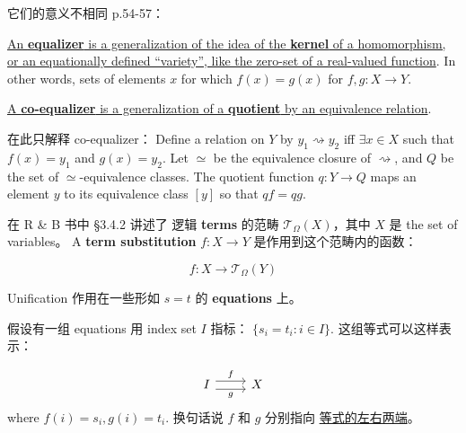 \documentclass[12pt, orivec]{article}
\newcommand{\cc}[2]{#1}
\newcommand{\cc}[2]{#2}
\begin{document}
\cc{它们的意义不相同 \parencite{Awodey2006} p.54-57：
}{
Their meanings are different \parencite{Awodey2006} p.54-57:
}

\uline{An \textbf{equalizer} is a generalization of the idea of the \textbf{kernel} of a homomorphism, or an equationally defined ``variety'', like the zero-set of a real-valued function}.  In other words, sets of elements $x$ for which $f(x) = g(x)$ for $f,g: X \rightarrow Y$.

\uline{A \textbf{co-equalizer} is a generalization of a \textbf{quotient} by an equivalence relation}.

\cc{在此只解释 co-equalizer： }
{ Here we only explain the co-equalizer: }
Define a relation on $Y$ by $y_1 \rightsquigarrow y_2$ iff $\exists x \in X$ such that $f(x) = y_1$ and $g(x) = y_2$.  Let $\simeq$ be the equivalence closure of $\rightsquigarrow$, and $Q$ be the set of $\simeq$-equivalence classes.  The quotient function $q: Y \rightarrow Q$ maps an element $y$ to its equivalence class $[y]$ so that $qf = qg$.

\cc{在 R \& B 书中 \S 3.4.2 讲述了 逻辑 \textbf{terms} 的范畴 $\mathcal{T}_{\Omega}(X)$，其中 $X$ 是 the set of variables。  A \textbf{term substitution} $f: X \rightarrow Y$ 是作用到这个范畴内的函数：
}{
In the R \& B book \S 3.4.2 describes the scope of the logical \textbf{terms} $\mathcal{T}_{\Omega}(X)$, where $X$ is the set of variables. A \textbf{term substitution} $f: X \rightarrow Y$ is a function that acts on this category:
}
\begin{equation}
f: X \rightarrow \mathcal{T}_{\Omega}(Y)
\end{equation}

\cc{Unification 作用在一些形如 $s = t$ 的 \textbf{equations} 上。
}{
Unification works on \textbf{equations} in the form $s = t$.
}

\cc{假设有一组 equations 用 index set $I$ 指标： $\{ s_i = t_i : i \in I \}$.  这组等式可以这样表示：
}{
Suppose there is a set of equations with index set $I$ indicator: $\{ s_i = t_i : i \in I \}$. This set of equations can be expressed like this:
}
\begin{equation}
\begin{tikzcd}
I \ar[r,shift left=.75ex,"f"]
  \ar[r,shift right=.75ex,swap,"g"]
& X
\end{tikzcd}
\end{equation}
\cc{where $f(i) = s_i, g(i) = t_i$.  换句话说 $f$ 和 $g$ 分别指向 \uline{等式的左右两端}。
}{
Where $f(i) = s_i, g(i) = t_i$. In other words, $f$ and $g$ point to the left and right ends of the \uline{ equation, respectively}.
}
\end{document}
